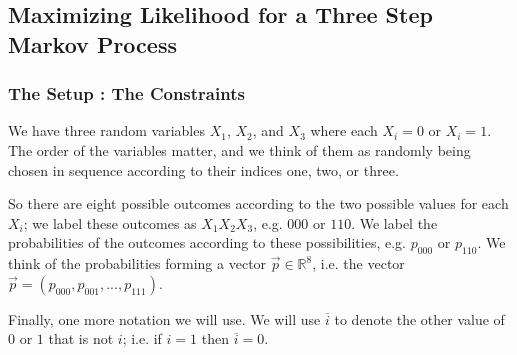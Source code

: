\subsection{Maximizing Likelihood for a Three Step Markov Process}

\subsubsection*{The Setup : The Constraints}

\newcommand{\flip}[1]{\overline{#1}}

We have three random variables \(X_1\), \(X_2\), and \(X_3\) where each \(X_i = 0\) or \(X_i = 1\). The order
of the variables matter, and we think of them as randomly being chosen in sequence according to their indices
one, two, or three. 

So there are eight possible outcomes according to the two possible values for each \(X_i\); we label these
outcomes as \(X_1X_2X_3\), e.g. \(000\) or \(110\). We label the probabilities of the outcomes according to these  
possibilities, e.g. \(p_{000}\) or \(p_{110}\). We think of the probabilities forming a vector 
\(\vec p \in \mathbb R^8\), i.e. the vector \(\vec p = (p_{000}, p_{001}, ..., p_{111})\). 

Finally, one more notation we will use. We will use \(\flip i\) to denote the other value of \(0\) or \(1\) that 
is not \(i\); i.e. if \(i = 1\) then \(\flip i = 0\).

